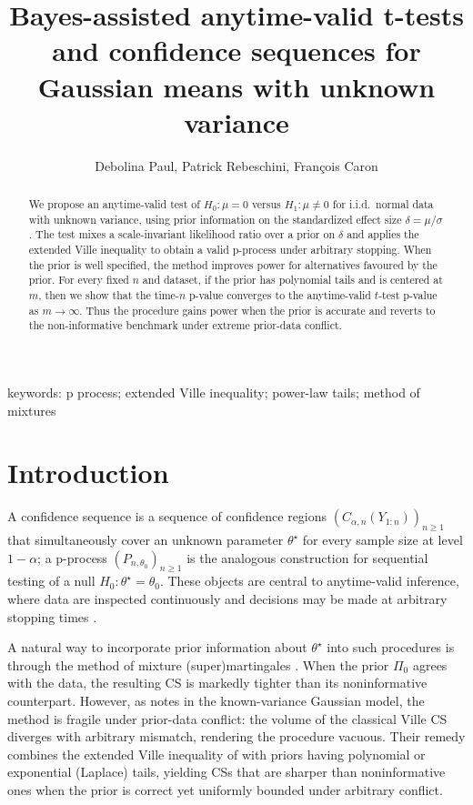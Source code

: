 \documentclass{article}%
\begin{document}
\title{Bayes-assisted anytime-valid t-tests and confidence sequences for Gaussian means with unknown variance}
\author{Debolina Paul, Patrick Rebeschini, Fran\c{c}ois Caron}
\maketitle

\begin{abstract}

We propose an anytime-valid test of $H_0:\mu=0$ versus $H_1:\mu\neq 0$ for i.i.d.\ normal data with unknown variance, using prior information on the standardized effect size $\delta=\mu/\sigma$. The test mixes a scale-invariant likelihood ratio over a prior on $\delta$ and applies the extended Ville inequality to obtain a valid p-process under arbitrary stopping. When the prior is well specified, the method improves power for alternatives favoured by the prior. For every fixed $n$ and dataset, if the prior has polynomial tails and is centered at $m$, then we show that the time-$n$ p-value converges to the anytime-valid $t$-test p-value as $m\to\infty$. Thus the procedure gains power when the prior is accurate and reverts to the non-informative benchmark under extreme prior-data conflict.

\end{abstract}

keywords: p process; extended Ville inequality; power-law tails; method of mixtures 

\section{Introduction}
\label{sec:intro}

A confidence sequence \citep{Darling1967,Robbins1970,Lai1976,Howard2021}
is a sequence of confidence regions
\((C_{\alpha,n}(Y_{1:n}))_{n\geq 1}\) that simultaneously cover an
unknown parameter \(\theta^\star\) for every sample size at level
\(1-\alpha\); a p-process \((P_{n,\theta_0})_{n\geq 1}\) is the
analogous construction for sequential testing of a null
\(H_0:\theta^\star=\theta_0\). These objects are central to anytime-valid
inference, where data are inspected continuously and decisions may be
made at arbitrary stopping times
\citep{Howard2021,RamdasGrunwald2023,Wang2025}.

A natural way to incorporate prior information about
\(\theta^\star\) into such procedures is through the method of mixture
(super)martingales \citep{Robbins1970,Lai1976,Wang2025}. When the
prior \(\Pi_0\) agrees with the data, the resulting CS is markedly
tighter than its noninformative counterpart. However, as
\cite{Cortinovis2025} notes in the known-variance Gaussian model,
the method is fragile under prior-data conflict: the volume of the
classical Ville CS diverges with arbitrary mismatch, rendering the
procedure vacuous. Their remedy combines the extended Ville
inequality of \cite{wang2025extended} with priors having polynomial or
exponential (Laplace) tails, yielding CSs that are sharper than
noninformative ones when the prior is correct yet uniformly
bounded under arbitrary conflict.
\end{document}
